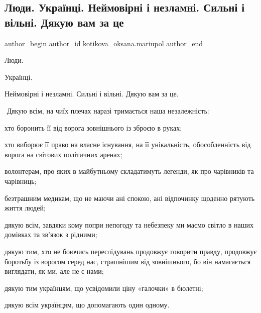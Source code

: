 
 
 
 
 

\subsection{Люди. Українці.  Неймовірні і незламні. Сильні і вільні. Дякую вам за це}
\label{sec:07_01_2023.fb.kotikova_oksana.mariupol.1.lyudi__ukra_nts____n}

\ifcmt
 author_begin
   author_id kotikova_oksana.mariupol
 author_end
\fi

Люди.

Українці. 

Неймовірні і незламні. Сильні і вільні. Дякую вам за це.

 Дякую всім, на чиїх плечах наразі тримається наша незалежність: 

хто боронить її від ворога зовнішнього із зброєю в руках; 

хто виборює її право на власне існування, на її унікальність, обособленність
від ворога на світових політичних аренах; 

волонтерам, про яких в майбутньому складатимуть легенди, як про чарівників та
чарівниць; 

безтрашним медикам, що не маючи ані спокою, ані відпочинку щоденно рятують
життя людей; 

дякую всім, завдяки кому попри непогоду та небезпеку ми маємо світло в наших
домівках та зв’язок з рідними; 

дякую тим, хто не боючись переслідувань продовжує говорити правду, продовжує
боротьбу із ворогом серед нас, страшнішим від зовнішнього, бо він намагається
виглядати, як ми, але не є нами; 

дякую тим українцям, що усвідомили ціну «галочки» в бюлетні; 

дякую всім українцям, що допомагають один одному. 

